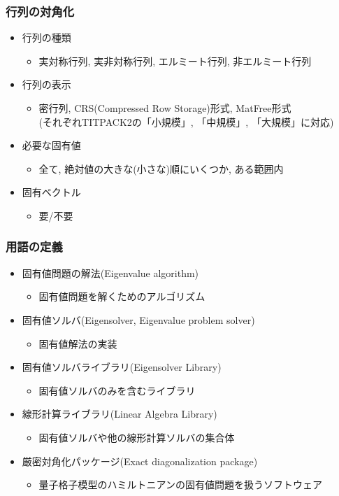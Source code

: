 \begin{frame}
  \frametitle{行列の対角化}
  \begin{itemize}
  \item 行列の種類
    \begin{itemize}
    \item 実対称行列, 実非対称行列, エルミート行列, 非エルミート行列
    \end{itemize}
  \item 行列の表示
    \begin{itemize}
      \item 密行列, CRS(Compressed Row Storage)形式, MatFree形式\\
            (それぞれTITPACK2の「小規模」, 「中規模」, 「大規模」に対応)
    \end{itemize}
  \item 必要な固有値
    \begin{itemize}
      \item 全て, 絶対値の大きな(小さな)順にいくつか, ある範囲内
    \end{itemize}
  \item 固有ベクトル
    \begin{itemize}
      \item 要/不要
    \end{itemize}
  \end{itemize}
\end{frame}

\begin{frame}
  \frametitle{用語の定義}
  \begin{itemize}
  \item 固有値問題の解法(Eigenvalue algorithm)
    \begin{itemize}
      \item 固有値問題を解くためのアルゴリズム
    \end{itemize}
  \item 固有値ソルバ(Eigensolver, Eigenvalue problem solver)
    \begin{itemize}
      \item 固有値解法の実装
    \end{itemize}
  \item 固有値ソルバライブラリ(Eigensolver Library)
    \begin{itemize}
      \item 固有値ソルバのみを含むライブラリ
    \end{itemize}
  \item 線形計算ライブラリ(Linear Algebra Library)
    \begin{itemize}
      \item 固有値ソルバや他の線形計算ソルバの集合体
    \end{itemize}
  \item 厳密対角化パッケージ(Exact diagonalization package)
    \begin{itemize}
      \item 量子格子模型のハミルトニアンの固有値問題を扱うソフトウェア
    \end{itemize}
  \end{itemize}
\end{frame}

